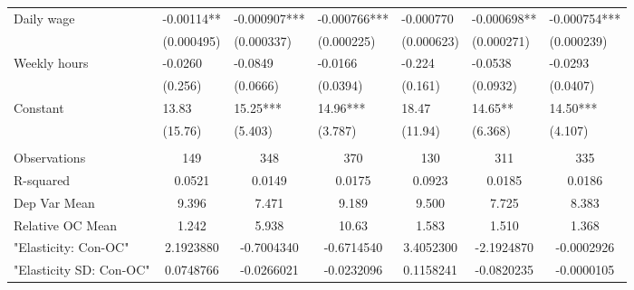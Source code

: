 \begin{tabular}{lcccccc}
Daily wage & \multicolumn{1}{l}{-0.00114**} & \multicolumn{1}{l}{-0.000907***} & \multicolumn{1}{l}{-0.000766***} & \multicolumn{1}{l}{-0.000770} & \multicolumn{1}{l}{-0.000698**} & \multicolumn{1}{l}{-0.000754***} \\
      & \multicolumn{1}{l}{(0.000495)} & \multicolumn{1}{l}{(0.000337)} & \multicolumn{1}{l}{(0.000225)} & \multicolumn{1}{l}{(0.000623)} & \multicolumn{1}{l}{(0.000271)} & \multicolumn{1}{l}{(0.000239)} \\
Weekly hours & \multicolumn{1}{l}{-0.0260} & \multicolumn{1}{l}{-0.0849} & \multicolumn{1}{l}{-0.0166} & \multicolumn{1}{l}{-0.224} & \multicolumn{1}{l}{-0.0538} & \multicolumn{1}{l}{-0.0293} \\
      & \multicolumn{1}{l}{(0.256)} & \multicolumn{1}{l}{(0.0666)} & \multicolumn{1}{l}{(0.0394)} & \multicolumn{1}{l}{(0.161)} & \multicolumn{1}{l}{(0.0932)} & \multicolumn{1}{l}{(0.0407)} \\
Constant & \multicolumn{1}{l}{13.83} & \multicolumn{1}{l}{15.25***} & \multicolumn{1}{l}{14.96***} & \multicolumn{1}{l}{18.47} & \multicolumn{1}{l}{14.65**} & \multicolumn{1}{l}{14.50***} \\
      & \multicolumn{1}{l}{(15.76)} & \multicolumn{1}{l}{(5.403)} & \multicolumn{1}{l}{(3.787)} & \multicolumn{1}{l}{(11.94)} & \multicolumn{1}{l}{(6.368)} & \multicolumn{1}{l}{(4.107)} \\
      &       &       &       &       &       &  \\
\midrule
Observations & 149   & 348   & 370   & 130   & 311   & 335 \\
R-squared & 0.0521 & 0.0149 & 0.0175 & 0.0923 & 0.0185 & 0.0186 \\
Dep Var Mean & 9.396 & 7.471 & 9.189 & 9.500 & 7.725 & 8.383 \\
Relative OC Mean & 1.242 & 5.938 & 10.63 & 1.583 & 1.510 & 1.368 \\
"Elasticity: Con-OC" & 2.1923880 & -0.7004340 & -0.6714540 & 3.4052300 & -2.1924870 & -0.0002926 \\
"Elasticity SD: Con-OC" & 0.0748766 & -0.0266021 & -0.0232096 & 0.1158241 & -0.0820235 & -0.0000105 \\
\bottomrule
\end{tabular}%
